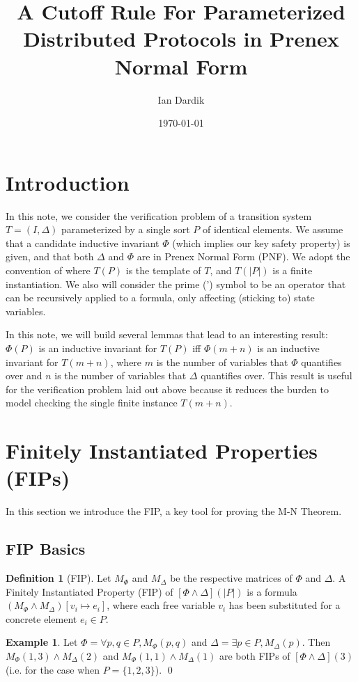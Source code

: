 \documentclass[12pt]{article}
\title{A Cutoff Rule For Parameterized Distributed Protocols in Prenex Normal Form}
\author{Ian Dardik}
\date{\today}
\theoremstyle{definition}
\newtheorem{definition}{Definition}
\newtheorem{example}{Example}
\theoremstyle{remark}
\begin{document}
\maketitle

\section{Introduction}
In this note, we consider the verification problem of a transition system $T=(I,\Delta)$ parameterized by a single sort $P$ of identical elements.  We assume that a candidate inductive invariant $\Phi$ (which implies our key safety property) is given, and that both $\Delta$ and $\Phi$ are in Prenex Normal Form (PNF).  We adopt the convention of \cite{goel2021symmetry} where $T(P)$ is the template of $T$, and $T(|P|)$ is a finite instantiation.  We also will consider the prime (') symbol to be an operator that can be recursively applied to a formula, only affecting (sticking to) state variables.

In this note, we will build several lemmas that lead to an interesting result: $\Phi(P)$ is an inductive invariant for $T(P)$ iff $\Phi(m+n)$ is an inductive invariant for $T(m+n)$, where $m$ is the number of variables that $\Phi$ quantifies over and $n$ is the number of variables that $\Delta$ quantifies over.  This result is useful for the verification problem laid out above because it reduces the burden to model checking the single finite instance $T(m+n)$.


\section{Finitely Instantiated Properties (FIPs)}
In this section we introduce the FIP, a key tool for proving the M-N Theorem.

\subsection{FIP Basics}

\begin{definition}[FIP]
  Let $M_{\Phi}$ and $M_{\Delta}$ be the respective matrices of $\Phi$ and $\Delta$.  A Finitely Instantiated Property (FIP) of $[\Phi\land\Delta](|P|)$ is a formula $(M_{\Phi} \land M_{\Delta})[v_i \mapsto e_i]$, where each free variable $v_i$ has been substituted for a concrete element $e_i \in P$.  
\end{definition}

\begin{example}
  Let $\Phi = \forall p,q \in P, M_{\Phi}(p,q)$ and $\Delta = \exists p \in P, M_{\Delta}(p)$.  Then $M_{\Phi}(1,3) \land M_{\Delta}(2)$ and $M_{\Phi}(1,1) \land M_{\Delta}(1)$ are both FIPs of $[\Phi\land\Delta](3)$ (i.e. for the case when $P=\{1,2,3\}$).  
  \qed
\end{example}
\end{document}
